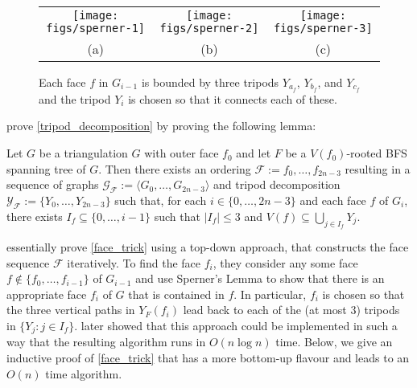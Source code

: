 \documentclass{patmorin}
\begin{document}

\begin{figure}
  \begin{center}
    \begin{tabular}{ccc}
      \texttt{[image: figs/sperner-1]} &
      \texttt{[image: figs/sperner-2]} &
      \texttt{[image: figs/sperner-3]} \\
      (a) & (b) & (c)
    \end{tabular}
  \end{center}
  \caption{Each face $f$ in $G_{i-1}$ is bounded by three tripods $Y_{a_f}$, $Y_{b_f}$, and $Y_{c_f}$ and the tripod $Y_i$ is chosen so that it connects each of these.}
  \label{sperner}
\end{figure}

\citet{dujmovic.joret.ea:planar} prove \cref{tripod_decomposition} by proving the following lemma:

\begin{lem}\label{face_trick}
  Let $G$ be a triangulation $G$ with outer face $f_0$ and let $F$ be a $V(f_0)$-rooted BFS spanning tree of $G$.  Then there exists an ordering $\mathcal{F}:=f_0,\ldots,f_{2n-3}$ resulting in a sequence of graphs $\mathcal{G_F}:=\langle G_0,\ldots,G_{2n-3}\rangle$ and tripod decomposition $\mathcal{Y_F}:=\{Y_0,\ldots,Y_{2n-3}\}$ such that, for each $i\in\{0,\ldots,2n-3\}$ and each face $f$ of $G_i$, there exists $I_f\subseteq\{0,\ldots,i-1\}$ such that $|I_f|\le 3$ and $V(f)\subseteq \bigcup_{j\in I_f} Y_j$.
\end{lem}

\citet{dujmovic.joret.ea:planar} essentially prove \cref{face_trick} using a top-down approach, that constructs the face sequence $\mathcal{F}$ iteratively.  To find the face $f_i$, they consider any some face $f\not\in\{f_0,\ldots,f_{i-1}\}$ of $G_{i-1}$ and use Sperner's Lemma to show that there is an appropriate face $f_i$ of $G$ that is contained in $f$. In particular, $f_i$ is chosen so that the three vertical paths in $Y_F(f_i)$ lead back to each of the (at most 3) tripods in $\{Y_j:j\in I_f\}$. \citet{morin:fast} later showed that this approach could be implemented in such a way that the resulting algorithm runs in $O(n\log n)$ time.  Below, we give an inductive proof of \cref{face_trick} that has a more bottom-up flavour and leads to an $O(n)$ time algorithm.
\end{document}

